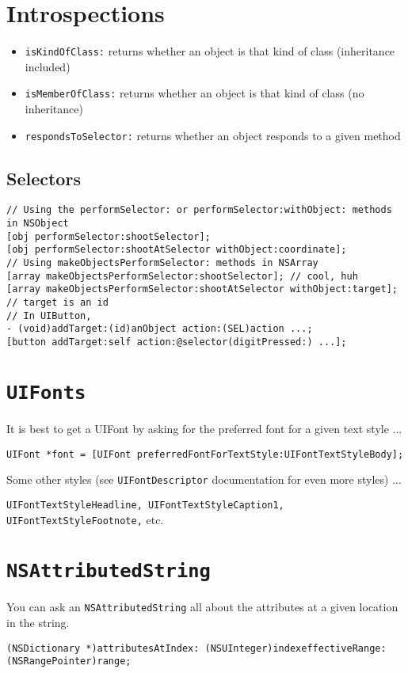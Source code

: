\documentclass[12pt]{article}
\newcommand{\co}{\texttt}
\begin{document}
\tableofcontents
\newpage

\section{Introspections}
\begin{itemize}
\item \co{isKindOfClass:} returns whether an object is that kind of class (inheritance included) 
\item \co{isMemberOfClass:} returns whether an object is that kind of class (no inheritance) 
\item \co{respondsToSelector:} returns whether an object responds to a given method
\end{itemize}

\subsection{Selectors}

\begin{lstlisting}
// Using the performSelector: or performSelector:withObject: methods in NSObject
[obj performSelector:shootSelector];
[obj performSelector:shootAtSelector withObject:coordinate];
// Using makeObjectsPerformSelector: methods in NSArray
[array makeObjectsPerformSelector:shootSelector]; // cool, huh
[array makeObjectsPerformSelector:shootAtSelector withObject:target]; // target is an id
// In UIButton, 
- (void)addTarget:(id)anObject action:(SEL)action ...; 
[button addTarget:self action:@selector(digitPressed:) ...];
\end{lstlisting}

\section{\co{UIFonts}}
It is best to get a UIFont by asking for the preferred font for a given text style ... 

\begin{lstlisting} 
UIFont *font = [UIFont preferredFontForTextStyle:UIFontTextStyleBody]; 
\end{lstlisting}

Some other styles (see \co{UIFontDescriptor} documentation for even more styles) ... 

\co{UIFontTextStyleHeadline, UIFontTextStyleCaption1, UIFontTextStyleFootnote,} etc.

\section{\co{NSAttributedString}}
You can ask an \co{NSAttributedString} all about the attributes at a given location in the string.
\begin{lstlisting}
(NSDictionary *)attributesAtIndex: (NSUInteger)indexeffectiveRange:(NSRangePointer)range; 
\end{lstlisting}
\end{document}

